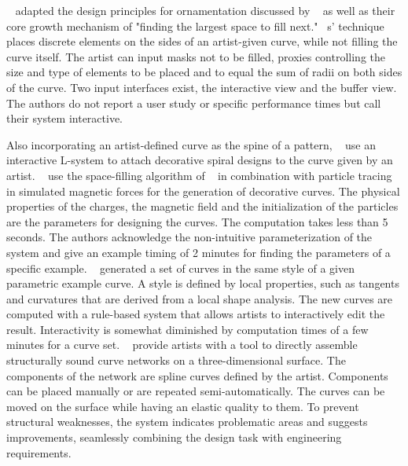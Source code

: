 \citeauthor*{anderson_2008_udt}~\cite{anderson_2008_udt} adapted the design principles for ornamentation discussed by \citeauthor*{wong_1998_cgf}~\cite{wong_1998_cgf} as well as their core growth mechanism of "finding the largest space to fill next."  \citeauthor*{anderson_2008_udt}~\cite{anderson_2008_udt}s' technique places discrete elements on the sides of an artist-given curve, while not filling the curve itself. The artist can input masks not to be filled, proxies controlling the size and type of elements to be placed and to equal the sum of radii on both sides of the curve. Two input interfaces exist, the interactive view and the buffer view. The authors do not report a user study or specific performance times but call their system interactive.  

Also incorporating an artist-defined curve as the spine of a pattern, \citeauthor*{yu_2012_ans}~\cite{yu_2012_ans} use an interactive L-system to attach decorative spiral designs to the curve given by an artist.
\citeauthor*{xu_2009_mcc}~\cite{xu_2009_mcc} use the space-filling algorithm of \citeauthor*{wong_1998_cgf}~\cite{wong_1998_cgf} in combination with particle tracing in simulated magnetic forces for the generation of decorative curves. The physical properties of the charges, the magnetic field and the initialization of the particles are the parameters for designing the curves. The computation takes less than 5 seconds. The authors acknowledge the non-intuitive parameterization of the system and give an example timing of 2 minutes for finding the parameters of a specific example.
\citeauthor*{merrell_2010_ecs}~\cite{merrell_2010_ecs} generated a set of curves in the same style of a given parametric example curve. A style is defined by local properties, such as tangents and curvatures that are derived from a local shape analysis. The new curves are computed with a rule-based system that allows artists to interactively edit the result. Interactivity is somewhat diminished by computation times of a few minutes for a curve set.
\citeauthor*{zehnder_2016_dso}~\cite{zehnder_2016_dso} provide artists with a tool to directly assemble structurally sound curve networks on a three-dimensional surface. The components of the network are spline curves defined by the artist. Components can be placed manually or are repeated semi-automatically. The curves can be moved on the surface while having an elastic quality to them. To prevent structural weaknesses, the system indicates problematic areas and suggests improvements, seamlessly combining the design task with engineering requirements.

